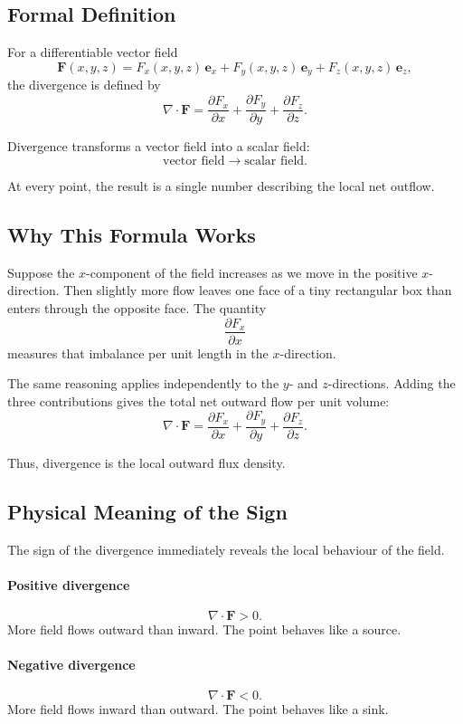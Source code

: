 \subsection{Formal Definition}

For a differentiable vector field
\[
\mathbf F(x,y,z)
=
F_x(x,y,z)\,\mathbf e_x
+
F_y(x,y,z)\,\mathbf e_y
+
F_z(x,y,z)\,\mathbf e_z,
\]
the divergence is defined by
\[
\boxed{
\nabla\cdot\mathbf F
=
\frac{\partial F_x}{\partial x}
+
\frac{\partial F_y}{\partial y}
+
\frac{\partial F_z}{\partial z}.
}
\]

Divergence transforms a vector field into a scalar field:
\[
\boxed{
\text{vector field}
\longrightarrow
\text{scalar field}.
}
\]

At every point, the result is a single number describing the local net outflow.

\subsection{Why This Formula Works}

Suppose the $x$-component of the field increases as we move in the positive
$x$-direction. Then slightly more flow leaves one face of a tiny rectangular
box than enters through the opposite face. The quantity
\[
\frac{\partial F_x}{\partial x}
\]
measures that imbalance per unit length in the $x$-direction.

The same reasoning applies independently to the $y$- and $z$-directions.
Adding the three contributions gives the total net outward flow per unit
volume:
\[
\nabla\cdot\mathbf F
=
\frac{\partial F_x}{\partial x}
+
\frac{\partial F_y}{\partial y}
+
\frac{\partial F_z}{\partial z}.
\]

Thus, divergence is the local outward flux density.

\subsection{Physical Meaning of the Sign}

The sign of the divergence immediately reveals the local behaviour of the
field.

\paragraph{Positive divergence}
\[
\nabla\cdot\mathbf F>0.
\]
More field flows outward than inward. The point behaves like a source.

\paragraph{Negative divergence}
\[
\nabla\cdot\mathbf F<0.
\]
More field flows inward than outward. The point behaves like a sink.

